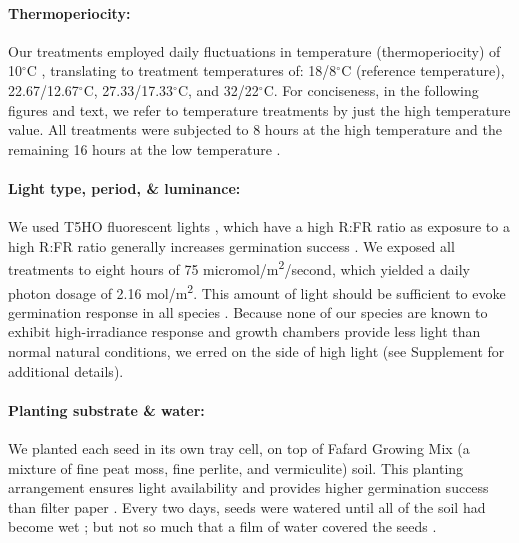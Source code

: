 \documentclass[11pt]{article}\usepackage[]{graphicx}\usepackage[]{color}
\begin{document}
	\paragraph{Thermoperiocity:} Our treatments employed daily fluctuations in temperature (thermoperiocity) of 10$^\circ$C \parencite[see e.g.,][]{Steinbauer1957, Toole1963,ISTA1954}, translating to treatment temperatures of: 18/8$^\circ$C (reference temperature), 22.67/12.67$^\circ$C, 27.33/17.33$^\circ$C, and 32/22$^\circ$C. For conciseness, in the following figures and text, we refer to temperature treatments by just the high temperature value. All treatments were subjected to 8 hours at the high temperature and the remaining 16 hours at the low temperature \parencite{Baskin1998,Roberts1981,Popay1970,Probert2000}. %

	\paragraph{Light type, period, \& luminance:} We used T5HO fluorescent lights \parencite{Toole1963}, which have a high R:FR ratio as exposure to a high R:FR ratio generally increases germination success \parencite[though some studies find germination requires high R:FR ratio or is insensitive,][]{Popay1970,Pons2000,Wulff1994}. %
We exposed all treatments to eight hours \parencite[coinciding with the higher temperature,][]{Baskin1998} of 75 micromol/m\textsuperscript{2}/second, which yielded a daily photon dosage of 2.16 mol/m\textsuperscript{2}. This amount of light should be sufficient to evoke germination response in all species \parencite{Pons1991}. Because none of our species are known to exhibit high-irradiance response and  growth chambers provide less light than normal natural conditions, we erred on the side of high light (see Supplement for additional details). 
	
	\paragraph{Planting substrate \& water:} We planted each seed in its own tray cell, on top of Fafard Growing Mix (a mixture of fine peat moss, fine perlite, and vermiculite) soil. This planting arrangement ensures light availability \parencite{Tester1987} and provides higher germination success than filter paper \parencite{Andrews1974}. Every two days, seeds were watered until all of the soil had become wet \parencite{Steinbauer1957}; but not so much that a film of water covered the seeds \parencite{AOSA1960}.
	
\end{document}
